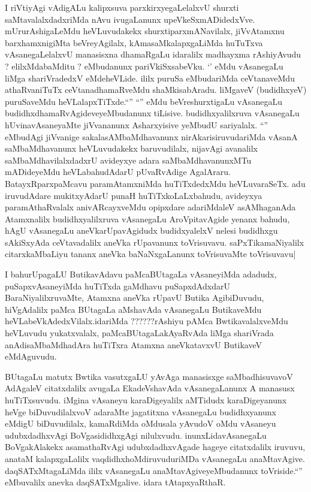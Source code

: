 \begin{artha}
I riVtiyAgi vAdigALu kalipxsuva parxkirxyegaLelalxvU shurxti
saMtavalalxdadxriMda nAvu ivugaLanunx
upeVkeSxmADidedxVve. mUrurAshigaLeMdu heVLuvudakekx
shurxtiparxmANavilalx, jiVvAtamxnu barxhamxnigiMta beVreyAgilalx,
kAmasaMkalapxgaLiMda huTuTxva vAsanegaLelalxvU manasisxna dhamaRgaLu
idaralilx madhayxma rAshiyAvudu ? elilxMdabaMditu ? eMbudanunx
pariVkiSxsabeVku. `\stext' eMdu vAsanegaLu liMga shariVradedxV
eMdeheVLide. ililx puruSa eMbudariMda ceVtanaveMdu athaRvaniTuTx
ceVtanadhamaRveMdu shaMkisabAradu. liMgaveV (budidhxyeV) puruSaveMdu
heVLalapxTiTxde.``\stext'' ``\stext'' eMdu  beVreshurxtigaLu
vAsanegaLu budidhxdhamaRvAgideveyeMbudanunx
tiLisive. budidhxyalilxruva vAsanegaLu hUvinavAsaneyaMte jiVvananunx
Asharxyisive yeMbudU sariyalalx. ``\stext'' eMbudAgi jiVvanige
sakalasAMbaMdhavanunx nirAkarisiruvudariMda vAsanA saMbaMdhavanunx
heVLuvudakekx baruvudilalx, nijavAgi avanalilx saMbaMdhavilalxdadxrU
avideyxye adara saMbaMdhavanunxMTu mADideyeMdu heVLabahudAdarU
pUvaRvAdige AgalAraru. BatayxRparxpaMcavu paramAtamxniMda
huTiTxdedxMdu heVLuvaraSeTx. adu iruvudAdare mukitxyAdarU punaH
huTiTxkoLaLxbahudu, avideyxya paramAthaRvalalx anivARcayxveMdu
opipxdare adariMdaleV asAMhaganAda Atamxnalilx budidhxyalilxruva
vAsanegaLu AroVpitavAgide yenanx bahudu, hAgU vAsanegaLu
aneVkarUpavAgidudx budidxyalelxV nelesi budidhxgu sAkiSxyAda
ceVtavadalilx aneVka rUpavanunx toVrisuvavu. saPxTikamaNiyalilx
citarxkaMbaLiyu tananx aneVka baNaNxgaLanunx toVrisuvaMte toVrisuvavu|
\end{artha}

\begin{artha}
I bahurUpagaLU ButikavAdavu paMcaBUtagaLa vAsaneyiMda adadudx,
puSapxvAsaneyiMda huTiTxda gaMdhavu puSapxdAdxdarU
BaraNiyalilxruvaMte, Atamxna aneVka rUpavU Butika AgibiDuvudu,
hiVgAdalilx paMca BUtagaLa aMshavAda vAsanegaLu ButikaveMdu
heVLabeVkAdedxVilalx.idariMda ??????rAshiyu pAMca BwtikavalalxveMdu
heVLuvudu yukatxvalalx, paMcaBUtagaLakAyaRvAda liMga shariVrada
anAdisaMbaMdhadAra huTiTxra Atamxna aneVkatavxvU ButikaveV eMdAguvudu.
\end{artha}

\begin{center}


\end{center}

\begin{artha}
BUtagaLu matutx Bwtika vasutxgaLU yAvAga manasisxge saMbadhisuvavoV
AdAgaleV citatxdalilx avugaLa EkadeVshavAda vAsanegaLanunx A manasusx
huTiTxsuvudu. iMgina vAsaneyu karaDigeyalilx aMTidudx karaDigeyanunx
heVge biDuvudilalxvoV adaraMte jagatitxna vAsanegaLu budidhxyanunx
eMdigU biDuvudilalx, kamaRdiMda oMdusala yAvudoV oMdu vAsaneyu
udubxdadhxvAgi BoVgasididhxgAgi nilulxvudu. inunxLidavAsanegaLu
BoVgakAlakekx asamathaRvAgi udubxdadhxvAgade hageye citatxdalilx
iruvuvu, anataM kalapxgaLalilx vaqdidhxhoMdiruvuduriMDa vAsanegaLu
anaMtavAgive. daqSATxMtagaLiMda ililx vAsanegaLu
anaMtavAgiveyeMbudanunx toVriside.``\stext'' eMbuvalilx anevka
daqSATxMgalive. idara tAtapxyaRthaR.
\end{artha}

